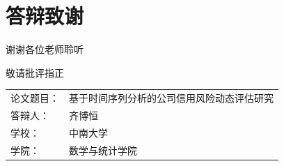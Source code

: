 \section{答辩致谢}

\begin{frame}[plain]
  \centering
  \vspace{1.8cm}
  {\color{CsuBlue}谢谢各位老师聆听\par}
  \vspace{0.6cm}
  {\color{CsuTeal}敬请批评指正\par}
  \vspace{1.2cm}
  \begin{tabular}{@{}ll@{}}
    论文题目： & 基于时间序列分析的公司信用风险动态评估研究 \\
    答辩人： & 齐博恒 \\
    学校： & 中南大学 \\
    学院： & 数学与统计学院
  \end{tabular}
\end{frame}
